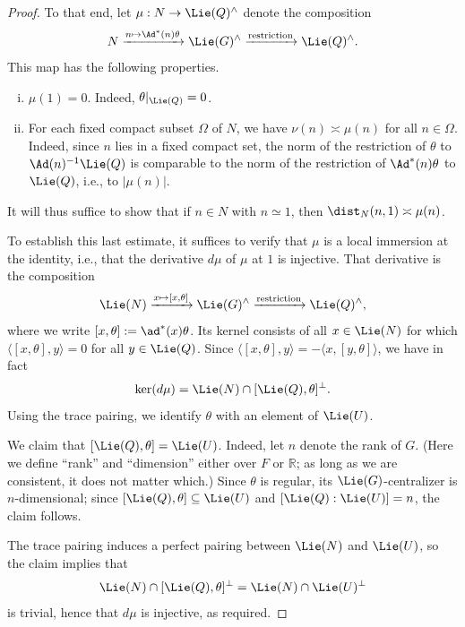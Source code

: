 \begin{proof}
  To that end, let $\mu : N \rightarrow \Lie(Q)^\wedge$ denote the composition
  \begin{equation*}
    N \xrightarrow{n \mapsto \Ad^*(n) \theta } \Lie(G)^\wedge \xrightarrow{\text{restriction}} \Lie(Q)^\wedge.
  \end{equation*}
  This map has the following properties.
  \begin{enumerate}[(i)]
  \item $\mu(1) = 0$.  Indeed, $\theta|_{\Lie(Q)} = 0$.
  \item For each fixed compact subset $\Omega$ of $N$, we have $\nu(n) \asymp \mu(n)$ for all $n \in \Omega$.  Indeed, since $n$ lies in a fixed compact set, the norm of the restriction of $\theta$ to $\Ad(n)^{-1} \Lie(Q)$ is comparable to the norm of the restriction of $\Ad^*(n) \theta$ to $\Lie(Q)$, i.e., to $|\mu(n)|$.
  \end{enumerate}
  It will thus suffice to show that if $n \in N$ with $n \simeq 1$, then $\dist_N(n,1) \asymp \mu(n)$.

  To establish this last estimate, it suffices to verify that $\mu$ is a local immersion at the identity, i.e., that the derivative $d \mu$ of $\mu$ at $1$ is injective.  That derivative is the composition
  \begin{equation*}
    \Lie(N) \xrightarrow{x \mapsto [x,\theta]} \Lie(G)^\wedge \xrightarrow{\text{restriction}} \Lie(Q)^\wedge,
  \end{equation*}
  where we write $[x,\theta] := \ad^*(x)\theta$.
  Its kernel consists of all $x \in \Lie(N)$ for which $\langle [x,\theta], y \rangle = 0$ for all $y \in \Lie(Q)$.  Since $\langle [x,\theta], y \rangle = -\langle x, [y,\theta] \rangle$, we have in fact
  \begin{equation*}
    \ker(d \mu) = \Lie(N) \cap [\Lie(Q), \theta]^\perp.
  \end{equation*}
  Using the trace pairing, we identify $\theta$ with an element of $\Lie(U)$.

  We claim that $[\Lie(Q), \theta] = \Lie(U)$.  Indeed, let $n$ denote the rank of $G$.  (Here we define ``rank'' and ``dimension'' either over $F$ or $\mathbb{R}$; as long as we are consistent, it does not matter which.)  Since $\theta$ is regular, its $\Lie(G)$-centralizer is $n$-dimensional; since $[\Lie(Q), \theta] \subseteq \Lie(U)$ and $[\Lie(Q):\Lie(U)] = n$, the claim follows.

  The trace pairing induces a perfect pairing between $\Lie(N)$ and $\Lie(U)$, so the claim implies that
  \begin{equation*}
    \Lie(N) \cap [\Lie(Q), \theta]^\perp = \Lie(N) \cap \Lie(U)^\perp
  \end{equation*}
  is trivial, hence that $d \mu$ is injective, as required.
\end{proof}

